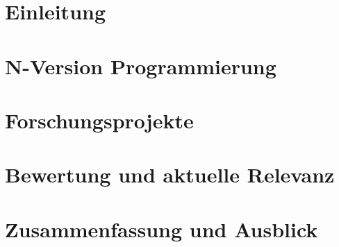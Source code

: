 \documentclass{llncs}
\begin{document}
\mainmatter  %


\tableofcontents

\cleardoublepage

\section{Einleitung} \label{einleitung}


\section{N-Version Programmierung} \label{definition}


\section{Forschungsprojekte} \label{beispiele}


\section{Bewertung und aktuelle Relevanz} \label{bewertung}


\section{Zusammenfassung und Ausblick} \label{zusammenfassung-ausblick}








%
\end{document}
